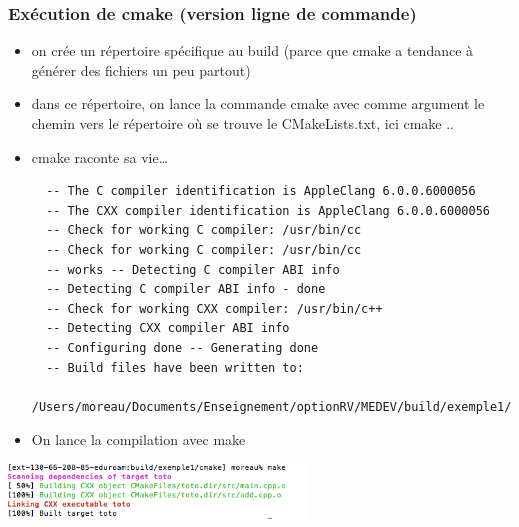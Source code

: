 \begin{frame}[fragile]\frametitle{Exécution de cmake (version ligne de commande)}

\begin{itemize}
\itemsep1pt\parskip0pt
\item
  on crée un répertoire spécifique au build (parce que cmake a tendance
  à générer des fichiers un peu partout)
\item
  dans ce répertoire, on lance la commande cmake avec comme argument le
  chemin vers le répertoire où se trouve le CMakeLists.txt, ici cmake ..
\item cmake raconte sa vie\ldots{}
{\tiny \begin{verbatim}
  -- The C compiler identification is AppleClang 6.0.0.6000056
  -- The CXX compiler identification is AppleClang 6.0.0.6000056
  -- Check for working C compiler: /usr/bin/cc
  -- Check for working C compiler: /usr/bin/cc
  -- works -- Detecting C compiler ABI info
  -- Detecting C compiler ABI info - done
  -- Check for working CXX compiler: /usr/bin/c++
  -- Detecting CXX compiler ABI info
  -- Configuring done -- Generating done
  -- Build files have been written to:
  /Users/moreau/Documents/Enseignement/optionRV/MEDEV/build/exemple1/cmake
\end{verbatim}}
\item
  On lance la compilation avec make
\end{itemize}

\begin{center}
\includegraphics[width=8cm]{fig/cmake-snap1.png}
\end{center}

\end{frame}

